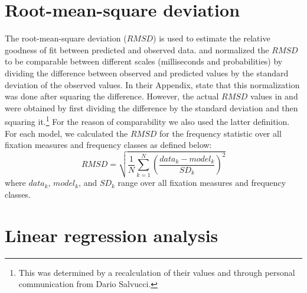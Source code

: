 \newpage
\begin{subappendices}


\section{Root-mean-square deviation}
The  root-mean-square deviation ($RMSD$) is used to estimate the relative goodness of fit between predicted and observed data.
\cite{Reichle1998} and \cite{Salvucci2001} normalized the $RMSD$ to be comparable between different scales (milliseconds and probabilities) by dividing the difference between observed and predicted values by the standard deviation of the observed values.   In their Appendix, \cite{Reichle1998} state that this normalization was done after squaring the difference.  However, the actual $RMSD$ values in \cite{Reichle1998} and \cite{Salvucci2001} were obtained by first dividing the difference by the standard deviation and then squaring it.\footnote{This was determined by a recalculation of their values and through personal communication from Dario Salvucci.}  For the reason of comparability we also used the latter definition. 
For each model, we calculated the $RMSD$ for the frequency statistic over all fixation measures and frequency classes as defined below:  
\begin{equation}
RMSD = \sqrt{\frac{1}{N}\sum_{k=1}^N\left(\frac{data_{k}-model_{k}}{SD_{k}}\right)^2}
\end{equation}
where $data_k$, $model_k$, and $SD_k$ range over all fixation measures and frequency classes. 

\section{Linear regression analysis}
 

\end{subappendices}
